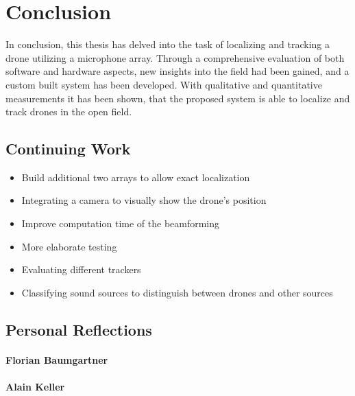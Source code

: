 \chapter{Conclusion}
In conclusion, this thesis has delved into the task of 
localizing and tracking a drone utilizing a microphone array. 
Through a comprehensive evaluation of both software and hardware aspects,
new insights into the field had been gained, and
a custom built system has been developed.
With qualitative and quantitative measurements it has been shown, 
that the proposed system is able to localize and track 
drones in the open field.

\section{Continuing Work}

\bigskip
\begin{itemize}
		\item Build additional two arrays to allow exact localization
		\item Integrating a camera to visually show the drone's position
		\item Improve computation time of the beamforming
		\item More elaborate testing
		\item Evaluating different trackers
		\item Classifying sound sources to distinguish between drones and other sources
\end{itemize}
\newpage

\newpage
\section{Personal Reflections}
\subsubsection{Florian Baumgartner}

\subsubsection{Alain Keller}
